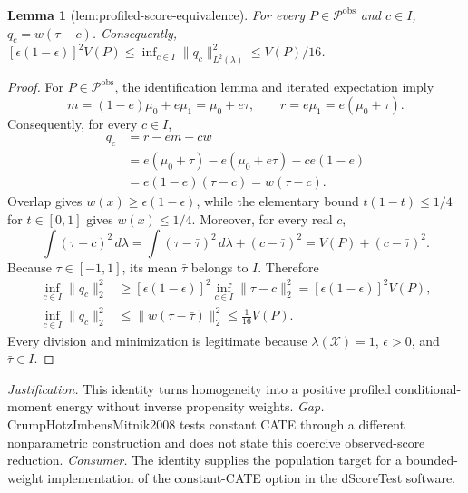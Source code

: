 \documentclass{article}
\newtheorem{lemma}{Lemma}
\begin{document}
\begin{lemma}[lem:profiled-score-equivalence]\label{lem:profiled-score-equivalence}
For every \(P\in\mathcal P^{\mathrm{obs}}\) and \(c\in I\), \(q_c=w(\tau-c)\). Consequently, \([\epsilon(1-\epsilon)]^2V(P)\le\inf_{c\in I}\|q_c\|_{L^2(\lambda)}^2\le V(P)/16\).
\end{lemma}
\begin{proof}
For \(P\in\mathcal P^{\mathrm{obs}}\), the identification lemma and iterated expectation imply
\[
 m=(1-e)\mu_0+e\mu_1=\mu_0+e\tau,
 \qquad
 r=e\mu_1=e(\mu_0+\tau).
\]
Consequently, for every \(c\in I\),
\[
\begin{aligned}
 q_c
 &=r-em-cw\\
 &=e(\mu_0+\tau)-e(\mu_0+e\tau)-ce(1-e)\\
 &=e(1-e)(\tau-c)=w(\tau-c).
\end{aligned}
\]
Overlap gives \(w(x)\ge\epsilon(1-\epsilon)\), while the elementary bound \(t(1-t)\le1/4\) for \(t\in[0,1]\) gives \(w(x)\le1/4\).  Moreover, for every real \(c\),
\[
 \int(\tau-c)^2\,d\lambda
 =\int(\tau-\bar\tau)^2\,d\lambda+(c-\bar\tau)^2
 =V(P)+(c-\bar\tau)^2.
\]
Because \(\tau\in[-1,1]\), its mean \(\bar\tau\) belongs to \(I\).  Therefore
\[
\begin{aligned}
 \inf_{c\in I}\|q_c\|_2^2
 &\ge [\epsilon(1-\epsilon)]^2
       \inf_{c\in I}\|\tau-c\|_2^2
 =[\epsilon(1-\epsilon)]^2V(P),\\
 \inf_{c\in I}\|q_c\|_2^2
 &\le \|w(\tau-\bar\tau)\|_2^2
 \le \frac1{16}V(P).
\end{aligned}
\]
Every division and minimization is legitimate because \(\lambda(\mathcal X)=1\), \(\epsilon>0\), and \(\bar\tau\in I\).
\end{proof}
\par\smallskip\noindent \textit{Justification.} This identity turns homogeneity into a positive profiled conditional-moment energy without inverse propensity weights. \textit{Gap.} CrumpHotzImbensMitnik2008 tests constant CATE through a different nonparametric construction and does not state this coercive observed-score reduction. \textit{Consumer.} The identity supplies the population target for a bounded-weight implementation of the constant-CATE option in the dScoreTest software.
\end{document}
